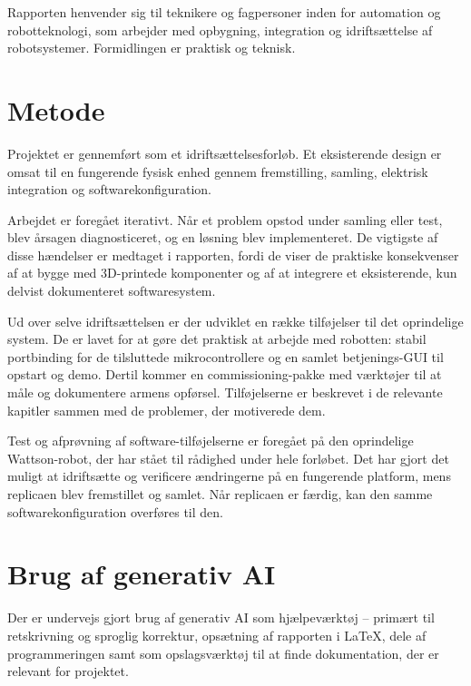 Rapporten henvender sig til teknikere og fagpersoner inden for
automation og robotteknologi, som arbejder med opbygning,
integration og idriftsættelse af robotsystemer. Formidlingen er
praktisk og teknisk.

\clearpage
\section{Metode}

Projektet er gennemført som et idriftsættelsesforløb. Et
eksisterende design er omsat til en fungerende fysisk enhed gennem
fremstilling, samling, elektrisk integration og
softwarekonfiguration.

Arbejdet er foregået iterativt. Når et problem opstod under samling
eller test, blev årsagen diagnosticeret, og en løsning blev
implementeret. De vigtigste af disse hændelser er medtaget i
rapporten, fordi de viser de praktiske konsekvenser af at bygge med
3D-printede komponenter og af at integrere et eksisterende, kun
delvist dokumenteret softwaresystem.

Ud over selve idriftsættelsen er der udviklet en række tilføjelser
til det oprindelige system. De er lavet for at gøre det praktisk at
arbejde med robotten: stabil portbinding for de tilsluttede
mikrocontrollere og en samlet betjenings-GUI til opstart og demo.
Dertil kommer en commissioning-pakke med værktøjer til at måle og
dokumentere armens opførsel. Tilføjelserne er beskrevet i de
relevante kapitler sammen med de problemer, der motiverede dem.

Test og afprøvning af software-tilføjelserne er foregået på den
oprindelige Wattson-robot, der har stået til rådighed under hele
forløbet. Det har gjort det muligt at idriftsætte og verificere
ændringerne på en fungerende platform, mens replicaen blev
fremstillet og samlet. Når replicaen er færdig, kan den samme
softwarekonfiguration overføres til den.

\section{Brug af generativ AI}

Der er undervejs gjort brug af generativ AI som hjælpeværktøj --
primært til retskrivning og sproglig korrektur, opsætning af
rapporten i LaTeX, dele af programmeringen samt som opslagsværktøj
til at finde dokumentation, der er relevant for projektet.


